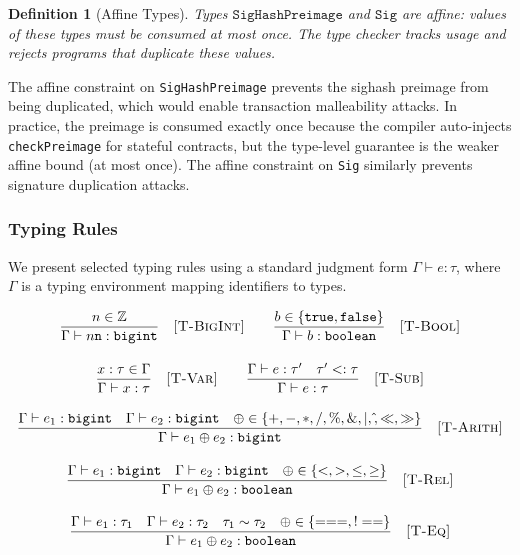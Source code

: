 \documentclass[11pt,a4paper]{article}
\newtheorem{definition}[theorem]{Definition}
\newcommand{\bigintty}{\texttt{bigint}}
\newcommand{\boolty}{\texttt{boolean}}
\newcommand{\subtype}{\mathrel{<:}}
\begin{document}
\begin{definition}[Affine Types]
Types $\texttt{SigHashPreimage}$ and $\texttt{Sig}$ are \emph{affine}: values
of these types must be consumed at most once. The type checker tracks usage
and rejects programs that duplicate these values.
\end{definition}

The affine constraint on \texttt{SigHashPreimage} prevents the sighash
preimage from being duplicated, which would enable transaction malleability
attacks. In practice, the preimage is consumed exactly once because the
compiler auto-injects \texttt{checkPreimage} for stateful contracts, but the
type-level guarantee is the weaker affine bound (at most once).
The affine constraint on \texttt{Sig} similarly prevents
signature duplication attacks.

\subsubsection{Typing Rules}

We present selected typing rules using a standard judgment form
$\Gamma \vdash e : \tau$, where $\Gamma$ is a typing environment mapping
identifiers to types.

\begin{gather}
\frac{n \in \mathbb{Z}}{\Gamma \vdash n\texttt{n} : \bigintty}
\quad \textsc{[T-BigInt]}
\qquad
\frac{b \in \{\texttt{true}, \texttt{false}\}}{\Gamma \vdash b : \boolty}
\quad \textsc{[T-Bool]}
\\[1em]
\frac{x : \tau \in \Gamma}{\Gamma \vdash x : \tau}
\quad \textsc{[T-Var]}
\qquad
\frac{\Gamma \vdash e : \tau' \quad \tau' \subtype \tau}{\Gamma \vdash e : \tau}
\quad \textsc{[T-Sub]}
\\[1em]
\frac{
  \Gamma \vdash e_1 : \bigintty \quad
  \Gamma \vdash e_2 : \bigintty \quad
  \oplus \in \{+, -, *, /, \%, \mathbin{\&}, |, \hat{}, \ll, \gg\}
}{
  \Gamma \vdash e_1 \oplus e_2 : \bigintty
}
\quad \textsc{[T-Arith]}
\\[1em]
\frac{
  \Gamma \vdash e_1 : \bigintty \quad
  \Gamma \vdash e_2 : \bigintty \quad
  \oplus \in \{<, >, \leq, \geq\}
}{
  \Gamma \vdash e_1 \oplus e_2 : \boolty
}
\quad \textsc{[T-Rel]}
\\[1em]
\frac{
  \Gamma \vdash e_1 : \tau_1 \quad
  \Gamma \vdash e_2 : \tau_2 \quad
  \tau_1 \sim \tau_2 \quad
  \oplus \in \{===, !==\}
}{
  \Gamma \vdash e_1 \oplus e_2 : \boolty
}
\quad \textsc{[T-Eq]}
\end{gather}
\end{document}

